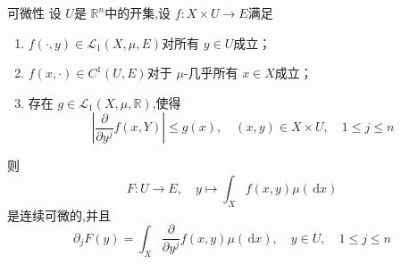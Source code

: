 \documentclass[lang=cn,12pt,color=green,fontset=none]{elegantbook}
\begin{document}
\begin{theorem}{可微性}
    设 $ U $是 $ \mathbb{R} ^{n} $中的开集,设 $ f: X\times U\to E $满足 
    \begin{enumerate}
        \item $ f\left( \cdot ,y \right)\in \mathcal{L}_{1}\left( X,\mu ,E \right)   $对所有 $  y\in U $成立；
        \item  $ f\left( x,\cdot  \right) \in C^{1}\left( U,E \right)   $对于 $ \mu  $-几乎所有 $ x \in X $成立；
        \item 存在 $ g \in  \mathcal{L}_{1}\left( X,\mu,\mathbb{R}  \right)  $,使得 $$
        \left| \frac{\partial }{\partial y^{j}} f\left( x,Y \right) \right| \le g\left( x \right),\quad \left( x,y \right)\in X\times U,\quad 1\le j\le n  
        $$      
    \end{enumerate}
       则 $$
       F:U\to E,\quad y\mapsto \int_{X}f\left( x,y \right) \mu \left( \,\mathrm{d} x \right)  
       $$是连续可微的,并且 $$
       \partial _{j}F\left( y \right)= \int_{X} \frac{\partial }{\partial y^{j}} f\left( x,y \right) \mu \left( \,\mathrm{d} x \right),\quad  y \in U,\quad  1\le j\le n  
       $$
\end{theorem}
\end{document}

